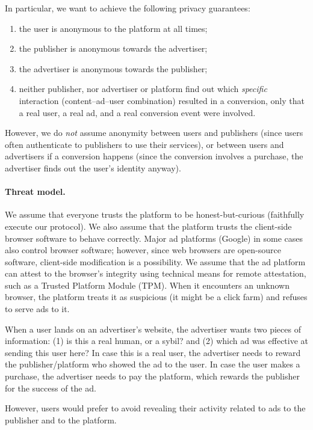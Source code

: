 In particular, we want to achieve the following privacy guarantees:
\begin{enumerate}[nosep]
  \item the user is anonymous to the platform at all times;
  \item the publisher is anonymous towards the advertiser;
  \item the advertiser is anonymous towards the publisher;
  \item neither publisher, nor advertiser or platform find out which \emph{specific} interaction (content--ad--user combination)
	resulted in a conversion, only that a real user, a real ad, and a real conversion event were involved.
\end{enumerate}
%
However, we do \emph{not} assume anonymity between users and publishers (since users often authenticate to publishers to use their services), or between users and advertisers if a conversion happens (since the conversion involves a purchase, the advertiser finds out the user's identity anyway).
%

\paragraph{Threat model.}
%
We assume that everyone trusts the platform to be honest-but-curious (\ie faithfully execute our protocol). 
%
We also assume that the platform trusts the client-side browser software to behave correctly.
%
Major ad platforms (\eg Google) in some cases also control browser software; however, since web browsers are open-source software, client-side modification is a possibility.
%
We assume that the ad platform can attest to the browser's integrity using technical means for remote attestation, such as a Trusted Platform Module (TPM).
%
When it encounters an unknown browser, the platform treats it as suspicious (\ie it might be a click farm) and refuses to serve ads to it.
%


%
When a user lands on an advertiser's website, the advertiser wants two pieces of information: (1) is this a real human, or a sybil? and (2) which ad was effective at sending this user here?
%
In case this is a real user, the advertiser needs to reward the publisher/platform who showed the ad to the user.
%
In case the user makes a purchase, the advertiser needs to pay the platform, which rewards the publisher for the success of the ad.
%

%
However, users would prefer to avoid revealing their activity related to ads to the publisher and to the platform.
%

